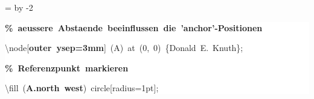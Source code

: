 \begingroup
\ttfamily
{}
=\textwidth
\advance{} by -2\fboxsep
\noindent
\colorbox{background}
{%
\parbox{\dimen255}
{%
\rule[-0.5ex]{0pt}{2.5ex}\hspace*{0.0em}\textcolor{G}{\textbf{\%~aeussere~Abstaende~beeinflussen~die~'anchor'{-}Positionen}}\\
\rule[-0.5ex]{0pt}{2.5ex}\hspace*{0.0em}\textbackslash{}node[\textcolor{R}{\textbf{outer~ysep=3mm}}]~(A)~at~(0,~0)~\{Donald~E.~Knuth\};\\
\rule[-0.5ex]{0pt}{2.5ex}\hspace*{0.0em}\textcolor{G}{\textbf{\%~Referenzpunkt~markieren}}\\
\rule[-0.5ex]{0pt}{2.5ex}\hspace*{0.0em}\textbackslash{}fill~(\textcolor{R}{\textbf{A.north~west}})~circle[radius=1pt];}%
}%
\endgroup
